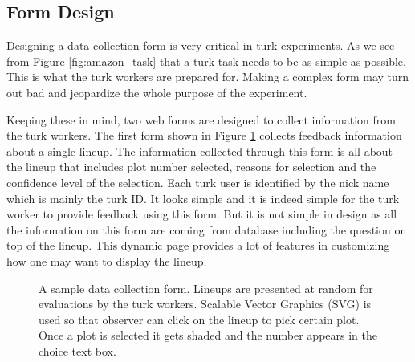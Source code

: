 \documentclass[11pt]{article}
\begin{document}
\subsection{Form Design}

Designing a data collection form is very critical in turk experiments. As we see from Figure \ref{fig:amazon_task} that a turk task needs to be as simple as possible. This is what the turk workers are prepared for. Making a complex form may turn out bad and jeopardize the whole purpose of the experiment. 

Keeping these in mind, two web forms are designed to collect information from the turk workers. The first form shown in Figure \ref{fig:turk_web} collects feedback information about a single lineup. The information collected through this form is all about the lineup that includes plot number selected, reasons for selection and the confidence level of the selection. Each turk user is identified by the nick name which is mainly the turk ID. It looks simple and it is indeed simple for the turk worker to provide feedback using this form. But it is not simple in design as all the information on this form are coming from database including the question on top of the lineup. This dynamic page provides a lot of features in customizing how one may want to display the lineup.

\begin{figure}[hbtp]
   \centering
       \caption{A sample data collection form. Lineups are presented at random for evaluations by the turk workers. Scalable Vector Graphics (SVG) is used so that observer can click on the lineup to pick certain plot. Once a plot is selected it gets shaded and the number appears in the choice text box.}
       \label{fig:turk_web}
\end{figure}
\end{document}
